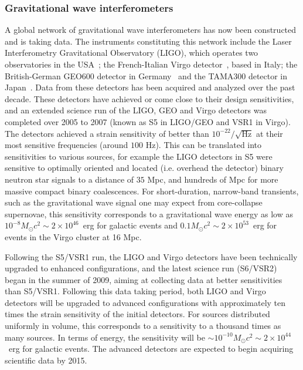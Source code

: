 \documentclass[epsf]{article}
\newcommand{\gw}{gravitational wave }
\begin{document}
\subsubsection{Gravitational wave interferometers}
\label{ssec:gw_det}

A global network of gravitational wave
interferometers has now been constructed and is taking data.  The instruments
constituting this network
include the Laser Interferometry Gravitational Observatory (LIGO), which operates two
observatories in the USA~\cite{Abbott:2007kv}; the French-Italian Virgo detector~\cite{Virgo_status}, based in Italy; the
British-German GEO600 detector in Germany~\cite{GEO_status} and the TAMA300 detector in Japan~\cite{TAMA_status}.  Data
from these detectors has been acquired and analyzed over the past
decade.  These detectors have achieved or come close to their design
sensitivities, and an extended science run of the
LIGO, GEO and Virgo detectors was completed over 2005 to 2007 (known as S5 in
LIGO/GEO and VSR1 in Virgo).  The detectors achieved a strain
sensitivity of better than $10^{-22}/\sqrt{\mathrm{Hz}}$ at their most
sensitive frequencies (around $100$ Hz).  This can be translated into
sensitivities to various sources, for example the LIGO detectors in S5
were sensitive to optimally oriented and located (i.e. overhead the
detector) binary neutron star signals to a distance of $35$ Mpc, and hundreds of Mpc for
more massive compact binary coalescences.  For short-duration, narrow-band transients,
such as the \gw signal one may expect from core-collapse supernovae,
this sensitivity corresponds to a gravitational wave energy as low as
$10^{-8} M_{\odot}c^2 \sim 2 \times 10^{46}$~erg for galactic events and $0.1 M_{\odot}c^2 \sim 2 \times 10^{53}$~erg for events in
the Virgo cluster at 16 Mpc.

Following the S5/VSR1 run, the LIGO and Virgo detectors have been
technically upgraded to enhanced configurations, and the latest science run
(S6/VSR2) began in the summer of 2009, aiming at collecting data at better sensitivities than S5/VSR1.  Following this data taking
period, both LIGO and Virgo detectors will be upgraded to advanced
configurations with approximately ten times the strain sensitivity of
the initial detectors.  For sources distributed uniformly in volume,
this corresponds to a sensitivity to a thousand times as many sources.
In terms of energy, the sensitivity will be $\sim 10^{-10} M_{\odot}c^2 \sim 2 \times 10^{44}$~erg
for galactic events.  The advanced detectors are expected to begin
acquiring scientific data by 2015. 
\end{document}
